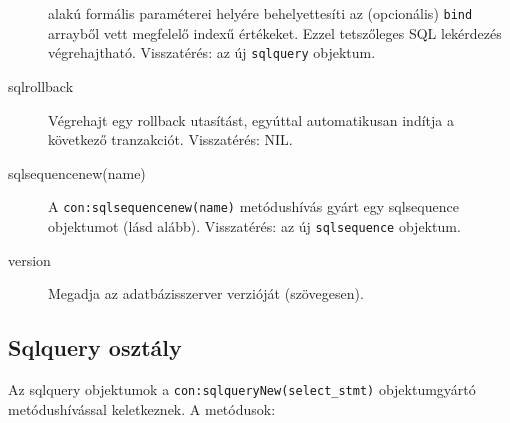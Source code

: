 \begin{description}
    alakú formális paraméterei helyére behelyettesíti
    az (opcionális) \verb!bind! arrayből vett megfelelő indexű értékeket.
    Ezzel tetszőleges  SQL lekérdezés végrehajtható.
    Visszatérés: az új \verb!sqlquery! objektum.
\item[sqlrollback]  %
    Végrehajt egy rollback utasítást, egyúttal
    automatikusan indítja a következő tranzakciót.
    Visszatérés: NIL.
\item[sqlsequencenew(name)]
    A \verb!con:sqlsequencenew(name)! metódushívás
    gyárt egy sqlsequence objektumot (lásd alább).
    Visszatérés: az új  \verb!sqlsequence! objektum.
\item[version]
    Megadja az adatbázisszerver verzióját (szövegesen).
\end{description}

\subsection{Sqlquery osztály}

Az sqlquery objektumok a \verb!con:sqlqueryNew(select_stmt)!
objektumgyártó metódushívással keletkeznek. A metódusok:

